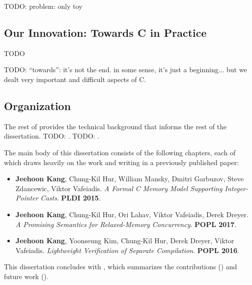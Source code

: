 TODO: problem: only toy



\subsection{Our Innovation: Towards C in Practice}

TODO

TODO: ``towards'': it's not the end.  in some sense, it's just a beginning...  but we dealt very
important and difficult aspects of C.


\subsection{Organization}

The rest of  provides the technical background that informs the rest of the
dissertation.  TODO: .  TODO: .

The main body of this dissertation consists of the following chapters, each of which draws heavily
on the work and writing in a previously published paper:

\begin{itemize}
\item {}

  \cite{intptrcast} \textbf{Jeehoon Kang}, Chung-Kil Hur, William Mansky, Dmitri Garbuzov,
  Steve Zdancewic, Viktor Vafeiadis.  \emph{A Formal C Memory Model Supporting Integer-Pointer
    Casts}.  \textbf{PLDI 2015}.  

\item {}

  \cite{promising} \textbf{Jeehoon Kang}, Chung-Kil Hur, Ori Lahav, Viktor Vafeiadis, Derek
  Dreyer.  \emph{A Promising Semantics for Relaxed-Memory Concurrency}.  \textbf{POPL 2017}.

\item {}

  \cite{sepcomp} \textbf{Jeehoon Kang}, Yoonseung Kim, Chung-Kil Hur, Derek Dreyer, Viktor
  Vafeiadis.  \emph{Lightweight Verification of Separate Compilation}.  \textbf{POPL 2016}.
\end{itemize}

This dissertation concludes with , which summarizes the contributions
() and future work ().


